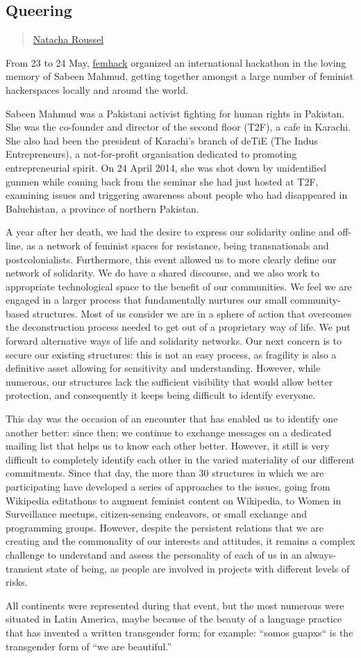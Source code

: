 \subsection{Queering}\label{queering}

\begin{quote}
\hyperlink{natacha-roussel}{Natacha Roussel}
\end{quote}

From 23 to 24 May, \href{http://femhack.org/}{femhack} organized an
international hackathon in the loving memory of Sabeen Mahmud, getting
together amongst a large number of feminist hackerspaces locally and
around the world.

Sabeen Mahmud was a Pakistani activist fighting for human rights in
Pakistan. She was the co-founder and director of the second floor (T2F),
a cafe in Karachi. She also had been the president of Karachi's branch
of deTiE (The Indus Entrepreneurs), a not-for-profit organisation
dedicated to promoting entrepreneurial spirit. On 24 April 2014, she was
shot down by unidentified gunmen while coming back from the seminar she
had just hosted at T2F, examining issues and triggering awareness about
people who had disappeared in Baluchistan, a province of northern
Pakistan.

A year after her death, we had the desire to express our solidarity
online and off-line, as a network of feminist spaces for resistance,
being transnationals and postcolonialists. Furthermore, this event
allowed us to more clearly define our network of solidarity. We do have
a shared discourse, and we also work to appropriate technological space
to the benefit of our communities. We feel we are engaged in a larger
process that fundamentally nurtures our small community-based
structures. Most of us consider we are in a sphere of action that
overcomes the deconstruction process needed to get out of a proprietary
way of life. We put forward alternative ways of life and solidarity
networks. Our next concern is to secure our existing structures: this is
not an easy process, as fragility is also a definitive asset allowing
for sensitivity and understanding. However, while numerous, our
structures lack the sufficient visibility that would allow better
protection, and consequently it keeps being difficult to identify
everyone.

This day was the occasion of an encounter that has enabled us to
identify one another better: since then; we continue to exchange
messages on a dedicated mailing list that helps us to know each other
better. However, it still is very difficult to completely identify each
other in the varied materiality of our different commitments. Since that
day, the more than 30 structures in which we are participating have
developed a series of approaches to the issues, going from Wikipedia
editathons to augment feminist content on Wikipedia, to Women in
Surveillance meetups, citizen-sensing endeavors, or small exchange and
programming groups. However, despite the persistent relations that we
are creating and the commonality of our interests and attitudes, it
remains a complex challenge to understand and assess the personality of
each of us in an always-transient state of being, as people are involved
in projects with different levels of risks.

All continents were represented during that event, but the most numerous
were situated in Latin America, maybe because of the beauty of a
language practice that has invented a written transgender form; for
example: ``somos guapxs`` is the transgender form of ``we are
beautiful.''
